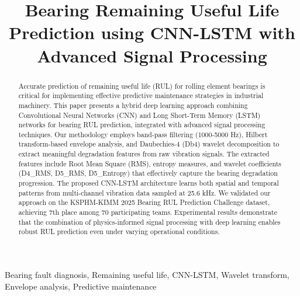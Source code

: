 \documentclass[conference,twocolumn]{IEEEtran}
\begin{document}
\title{Bearing Remaining Useful Life Prediction using CNN-LSTM with Advanced Signal Processing}

\author{
\and
{}
}

\maketitle

\begin{abstract}
Accurate prediction of remaining useful life (RUL) for rolling element bearings is critical for implementing effective predictive maintenance strategies in industrial machinery. This paper presents a hybrid deep learning approach combining Convolutional Neural Networks (CNN) and Long Short-Term Memory (LSTM) networks for bearing RUL prediction, integrated with advanced signal processing techniques. Our methodology employs band-pass filtering (1000-5000 Hz), Hilbert transform-based envelope analysis, and Daubechies-4 (Db4) wavelet decomposition to extract meaningful degradation features from raw vibration signals. The extracted features include Root Mean Square (RMS), entropy measures, and wavelet coefficients (D4\_RMS, D5\_RMS, D5\_Entropy) that effectively capture the bearing degradation progression. The proposed CNN-LSTM architecture learns both spatial and temporal patterns from multi-channel vibration data sampled at 25.6 kHz. We validated our approach on the KSPHM-KIMM 2025 Bearing RUL Prediction Challenge dataset, achieving 7th place among 70 participating teams. Experimental results demonstrate that the combination of physics-informed signal processing with deep learning enables robust RUL prediction even under varying operational conditions.
\end{abstract}

\begin{IEEEkeywords}
Bearing fault diagnosis, Remaining useful life, CNN-LSTM, Wavelet transform, Envelope analysis, Predictive maintenance
\end{IEEEkeywords}
\end{document}

